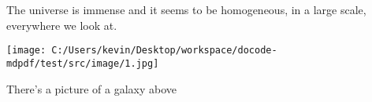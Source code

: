 \documentclass{article}
\begin{document}
The universe is immense and it seems to be homogeneous, 
in a large scale, everywhere we look at.
 
\texttt{[image: C:/Users/kevin/Desktop/workspace/docode-mdpdf/test/src/image/1.jpg]}
 
There's a picture of a galaxy above
\end{document}

